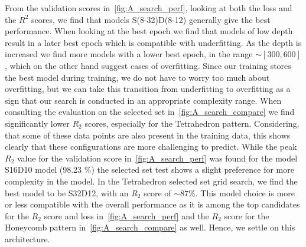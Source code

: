 From the validation scores in~\cref{fig:A_search_perf}, looking at both the loss and the $R^2$ scores, we find that models
S(8-32)D(8-12) generally give the best performance. When looking at the best epoch we find that models of low depth result in a later best epoch which is compatible
with underfitting. As the depth is increased we find more models with a lower
best epoch, in the range $\sim [300, 600]$, which on the other hand suggest
cases of overfitting. Since our training stores the best model during training,
we do not have to worry too much about overfitting, but we can take this
transition from underfitting to overfitting as a sign that our search is
conducted in an appropriate complexity range. When consulting the evaluation on the
selected set in~\cref{fig:A_search_compare} we find
significantly lower $R_2$ scores, especially for the Tetrahedron pattern. Considering, that some of these data points are also present in the training data, this shows clearly that these configurations are more challenging to predict. While the peak $R_2$ value for the validation score in~\cref{fig:A_search_perf} was found for the model S16D10 model (98.23 \%) the selected set test shows a slight preference for more complexity in the model. In the Tetrahedron selected set grid search, we find the best model to be S32D12, with an $R_2$ score of $\sim 87 \%$. This model choice is more or less compatible with the overall performance as it is among the top candidates for the $R_2$ score and loss in~\cref{fig:A_search_perf} and the $R_2$ score for the Honeycomb pattern in~\cref{fig:A_search_compare} as well. Hence, we settle on this architecture. 


